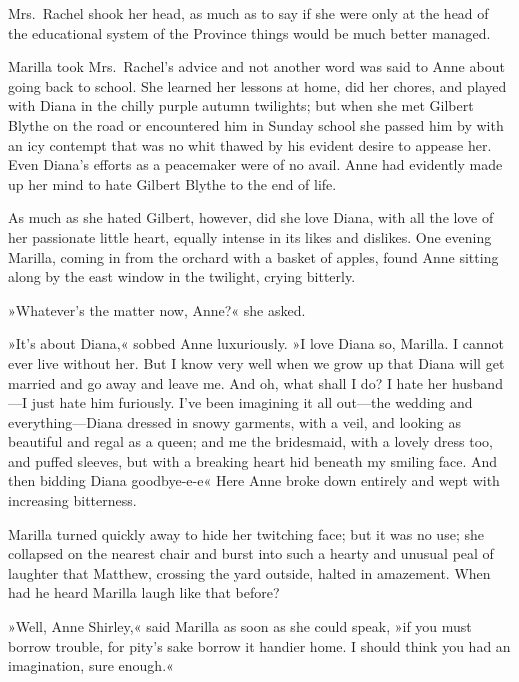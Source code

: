Mrs.~Rachel shook her head, as much as to say if she were only at the head of the educational system of the Province things would be much better managed.

Marilla took Mrs.~Rachel's advice and not another word was said to Anne about going back to school. She learned her lessons at home, did her chores, and played with Diana in the chilly purple autumn twilights; but when she met Gilbert Blythe on the road or encountered him in Sunday school she passed him by with an icy contempt that was no whit thawed by his evident desire to appease her. Even Diana's efforts as a peacemaker were of no avail. Anne had evidently made up her mind to hate Gilbert Blythe to the end of life.

As much as she hated Gilbert, however, did she love Diana, with all the love of her passionate little heart, equally intense in its likes and dislikes. One evening Marilla, coming in from the orchard with a basket of apples, found Anne sitting along by the east window in the twilight, crying bitterly.

»Whatever's the matter now, Anne?« she asked.

»It's about Diana,« sobbed Anne luxuriously. »I love Diana so, Marilla. I cannot ever live without her. But I know very well when we grow up that Diana will get married and go away and leave me. And oh, what shall I do? I hate her husband—I just hate him furiously. I've been imagining it all out—the wedding and everything—Diana dressed in snowy garments, with a veil, and looking as beautiful and regal as a queen; and me the bridesmaid, with a lovely dress too, and puffed sleeves, but with a breaking heart hid beneath my smiling face. And then bidding Diana goodbye-e-e\longdash« Here Anne broke down entirely and wept with increasing bitterness.

Marilla turned quickly away to hide her twitching face; but it was no use; she collapsed on the nearest chair and burst into such a hearty and unusual peal of laughter that Matthew, crossing the yard outside, halted in amazement. When had he heard Marilla laugh like that before?

»Well, Anne Shirley,« said Marilla as soon as she could speak, »if you must borrow trouble, for pity's sake borrow it handier home. I should think you had an imagination, sure enough.«